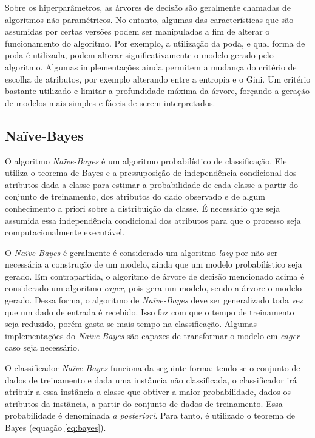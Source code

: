 \documentclass{article}
\begin{document}
Sobre os hiperparâmetros, as árvores de decisão são geralmente chamadas de algoritmos não-paramétricos.
No entanto, algumas das características que são assumidas por certas versões podem ser manipuladas
a fim de alterar o funcionamento do algoritmo.
Por exemplo, a utilização da poda, e qual forma de poda é utilizada,
podem alterar significativamente o modelo gerado pelo algoritmo.
Algumas implementações ainda permitem a mudança do critério de escolha de atributos,
por exemplo alterando entre a entropia e o Gini.
Um critério bastante utilizado e limitar a profundidade máxima da árvore,
forçando a geração de modelos mais simples e fáceis de serem interpretados.


\subsection{{Naïve-Bayes}}

O algoritmo {\it Naïve-Bayes} é um algoritmo probabilístico de classificação.
Ele utiliza o teorema de Bayes e a pressuposição de independência condicional
dos atributos dada a classe para estimar a probabilidade de cada classe a partir do conjunto de treinamento,
dos atributos do dado observado e de algum conhecimento a priori sobre a distribuição da classe.
É necessário que seja assumida essa independência condicional dos atributos para
que o processo seja computacionalmente executável.

O {\it Naïve-Bayes} é geralmente é considerado um algoritmo {\it lazy} por não ser necessária a construção de um modelo,
ainda que um modelo probabilístico seja gerado.
Em contrapartida, o algoritmo de árvore de decisão mencionado acima é considerado um algoritmo {\it eager},
pois gera um modelo, sendo a árvore o modelo gerado.
Dessa forma, o algoritmo de {\it Naïve-Bayes} deve ser generalizado toda vez que um dado de entrada é recebido.
Isso faz com que o tempo de treinamento seja reduzido, porém gasta-se mais tempo na classificação.
Algumas implementações do {\it Naïve-Bayes} são capazes de transformar o modelo em {\it eager}
caso seja necessário.

O classificador {\it Naïve-Bayes} funciona da seguinte forma:
tendo-se o conjunto de dados de treinamento e dada uma instância não classificada,
o classificador irá atribuir a essa instância a classe que obtiver a maior probabilidade,
dados os atributos da instância, a partir do conjunto de dados de treinamento.
Essa probabilidade é denominada {\it a posteriori}.
Para tanto, é utilizado o teorema de Bayes (equação \ref{eq:bayes}).
\end{document}
